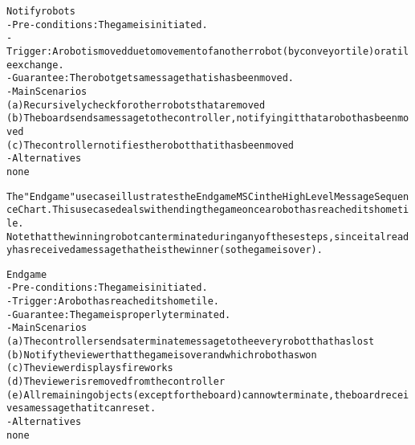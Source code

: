 \begin{alltt}
Notify robots
- Pre-conditions: The game is initiated.
- Trigger: A robot is moved due to movement of another robot (by conveyor tile) or a tile exchange.
- Guarantee: The robot gets a message that is has been moved.
- Main Scenarios
    (a) Recursively check for other robots that are moved
    (b) The board sends a message to the controller, notifying it that a robot has been moved
    (c) The controller notifies the robot that it has been moved
- Alternatives 
    none

The "End game" use case illustrates the End game MSC in the High Level Message Sequence Chart. This use case deals with ending the game once a robot has reached its home tile.
Note that the winning robot can terminate during any of these steps, since it already has received a message that he is the winner (so the game is over).

End game
- Pre-conditions: The game is initiated.
- Trigger:  A robot has reached its home tile.
- Guarantee: The game is properly terminated.
- Main Scenarios
    (a) The controller sends a terminate message to the every robot that has lost
    (b) Notify the viewer that the game is over and which robot has won
    (c) The viewer displays fireworks
    (d) The viewer is removed from the controller
    (e) All remaining objects (except for the board) can now terminate, the board receives a message that it can reset.
- Alternatives
    none
\end{alltt}
